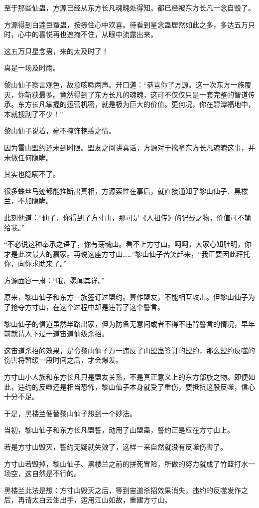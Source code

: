 \begin{this_body}
至于那些仙蛊，方源已经从东方长凡魂魄处得知。都已经被东方长凡一念自毁了。

方源得到白莲巨蚕蛊，按捺住心中欢喜。待看到星念蛊居然如此之多，多达五万只时，心中的喜悦再也遮掩不住，从眼中流露出来。

这五万只星念蛊，来的太及时了！

真是一场及时雨。

黎山仙子察言观色，故意咳嗽两声。开口道：“恭喜你了方源。这一次东方一族覆灭，你斩获最多。竟然得到了东方长凡的魂魄，这可不仅仅只是一套完整的智道传承。东方长凡掌握的运营机密，就是极为巨大的价值。更何况，你在碧潭福地中，本就搜刮了不少！”

黎山仙子说着，毫不掩饰艳羡之情。

因为雪山盟约还未到时限。盟友之间讲真话，方源对于擒拿东方长凡魂魄这事，并未做任何隐瞒。

其实也隐瞒不了。

很多蛛丝马迹都能推断出真相，方源索性在事后，就直接通知了黎山仙子、黑楼兰，不加隐瞒。

此刻他道：“仙子，你得到了方寸山，那可是《人祖传》的记载之物，价值可不输给我。”

“不必说这种奉承之语了，你有荡魂山。看不上方寸山。呵呵，大家心知肚明，你才是此次最大的赢家。再说这座方寸山……”黎山仙子苦笑起来，“我正要因此拜托你，向你求助来了。”

方源面容一肃：“哦，愿闻其详。”

原来，黎山仙子和东方一族签订过盟约。算作盟友，不能相互攻击。但黎山仙子为了抢夺方寸山，在这个过程中却是违背了这个誓言。

黎山仙子的信道虽然半路出家，但为防备无意间或者不得不违背誓言的情况，早年前就请人下过一道宙道仙级杀招。

这宙道杀招的效果，是令黎山仙子万一违反了山盟蛊签订的盟约，那么盟约反噬的伤害将暂缓一段时间之后，才会爆发。

方寸山小人族和东方长凡只是盟友关系，不是真正意义上的东方部族之物。即便如此，违约的反噬还是相当恐怖，黎山仙子本身就受了重伤，要抵抗这股反噬，信心十分不足。

于是，黑楼兰便替黎山仙子想到一个妙法。

当初，黎山仙子和东方长凡盟誓，动用了山盟蛊，誓约正是应在方寸山上。

若是方寸山毁灭，誓约无疑就失效了，这样一来自然就没有反噬伤害了。

方寸山若毁掉，黎山仙子、黑楼兰之前的拼死冒险，所做的努力就成了竹篮打水一场空，这自然是不行的。

黑楼兰此法是想：方寸山毁灭之后，等到宙道杀招效果消失，违约的反噬发作之后，再请太白云生出手，运用江山如故，重建方寸山。


\end{this_body}
